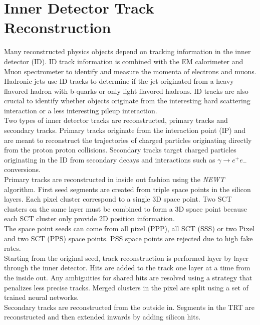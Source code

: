 \section{Inner Detector Track Reconstruction}
\label{sec:reco:IDtrack}

\indent  Many reconstructed physics objects depend on tracking information in the inner detector (ID).  ID track information is combined with the EM calorimeter and Muon spectrometer to identify and measure the momenta of electrons and muons.  Hadronic jets use ID tracks to determine if the jet originated from a heavy flavored hadron with b-quarks or only light flavored hadrons.  ID tracks are also crucial to identify whether objects originate from the interesting hard scattering interaction or a less interesting pileup interaction.\\

\indent Two types of inner detector tracks are reconstructed, primary tracks and secondary tracks.  Primary tracks originate from the interaction point (IP) and are meant to reconstruct the trajectories of charged particles originating directly from the proton proton collisions.  Secondary tracks target charged particles originating in the ID from secondary decays and interactions such as $\gamma \rightarrow e^{+}e_{-}$ conversions.  \\

\indent Primary tracks are reconstructed in inside out fashion using the {\it NEWT} algorithm.\cite{NEWT}  First seed segments are created from triple space points in the silicon layers.  Each pixel cluster correspond to a single 3D space point.  Two SCT clusters on the same layer must be combined to form a 3D space point because each SCT cluster only provide 2D position information.  \\

\indent The space point seeds can come from all pixel (PPP), all SCT (SSS) or two Pixel and two SCT (PPS) space points.  PSS space points are rejected due to high fake rates.  \\

\indent Starting from the original seed, track reconstruction is performed layer by layer through the inner detector. Hits are added to the track one layer at a time from the inside out.  Any ambiguities for shared hits are resolved using a strategy that penalizes less precise tracks.  Merged clusters in the pixel are split using a set of trained neural networks. \\

\indent  Secondary tracks are reconstructed from the outside in.  Segments in the TRT are reconstructed and then extended inwards by adding silicon hits. \\